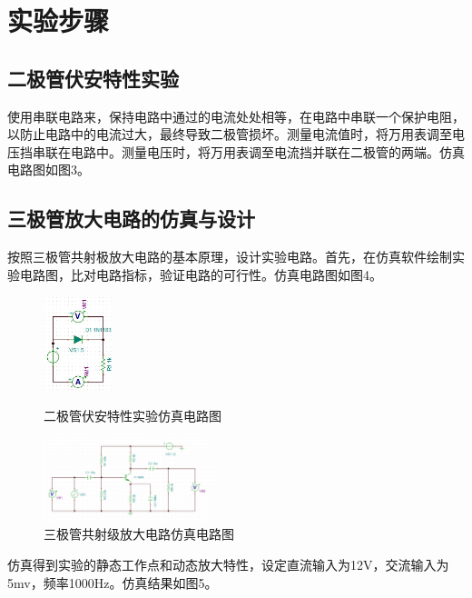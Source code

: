 \documentclass[]{article}
\begin{document}
\section{实验步骤}

\subsection{二极管伏安特性实验}

使用串联电路来，保持电路中通过的电流处处相等，在电路中串联一个保护电阻，以防止电路中的电流过大，最终导致二极管损坏。测量电流值时，将万用表调至电压挡串联在电路中。测量电压时，将万用表调至电流挡并联在二极管的两端。仿真电路图如图3。



\subsection{三极管放大电路的仿真与设计}

按照三极管共射极放大电路的基本原理，设计实验电路。首先，在仿真软件绘制实验电路图，比对电路指标，验证电路的可行性。仿真电路图如图4。


\begin{figure}[h]
	\centering
	
	\begin{minipage}{0.4\linewidth}
		\centering
		\includegraphics[width=2cm]{img/4_1}
		\caption{二极管伏安特性实验仿真电路图}
	\end{minipage}
	\begin{minipage}{0.4\linewidth}
		\centering
		\includegraphics[width=5cm]{img/4_2}
		\caption{三极管共射级放大电路仿真电路图}
	\end{minipage}

\end{figure}


仿真得到实验的静态工作点和动态放大特性，设定直流输入为12V，交流输入为5mv，频率1000Hz。仿真结果如图5。
\end{document}
